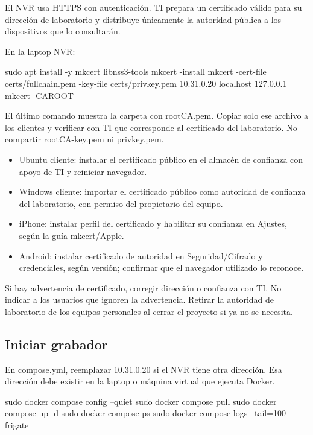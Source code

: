 \documentclass[12pt,a4paper]{article}
\begin{document}
El NVR usa HTTPS con autenticación. TI prepara un certificado válido para su dirección de laboratorio y distribuye únicamente la autoridad pública a los dispositivos que lo consultarán.\par
En la laptop NVR:\par
{}
\begin{Comandos}
sudo apt install -y mkcert libnss3-tools
mkcert -install
mkcert -cert-file certs/fullchain.pem -key-file certs/privkey.pem 10.31.0.20 localhost 127.0.0.1
mkcert -CAROOT
\end{Comandos}
El último comando muestra la carpeta con \textnormal{rootCA.pem}. Copiar solo ese archivo a los clientes y verificar con TI que corresponde al certificado del laboratorio. No compartir \textnormal{rootCA-key.pem} ni \textnormal{privkey.pem}.\par
\begin{itemize}
\item Ubuntu cliente: instalar el certificado público en el almacén de confianza con apoyo de TI y reiniciar navegador.
\item Windows cliente: importar el certificado público como autoridad de confianza del laboratorio, con permiso del propietario del equipo.
\item iPhone: instalar perfil del certificado y habilitar su confianza en Ajustes, según la guía mkcert/Apple.
\item Android: instalar certificado de autoridad en Seguridad/Cifrado y credenciales, según versión; confirmar que el navegador utilizado lo reconoce.
\end{itemize}
Si hay advertencia de certificado, corregir dirección o confianza con TI. No indicar a los usuarios que ignoren la advertencia. Retirar la autoridad de laboratorio de los equipos personales al cerrar el proyecto si ya no se necesita.\par
{}\subsection*{Iniciar grabador}
En \textnormal{compose.yml}, reemplazar \textnormal{10.31.0.20} si el NVR tiene otra dirección. Esa dirección debe existir en la laptop o máquina virtual que ejecuta Docker.\par
{}
\begin{Comandos}
sudo docker compose config --quiet
sudo docker compose pull
sudo docker compose up -d
sudo docker compose ps
sudo docker compose logs --tail=100 frigate
\end{Comandos}
\end{document}

